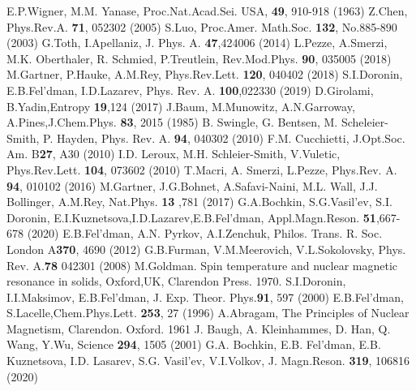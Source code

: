 \documentclass[preprint,12pt]{elsarticle}
\begin{document}
\begin{thebibliography}{20}
	 E.P.Wigner, M.M. Yanase, Proc.Nat.Acad.Sei. USA, \textbf{49}, 910-918 (1963)
	 Z.Chen, Phys.Rev.A. \textbf{71}, 052302 (2005)
   S.Luo, Proc.Amer. Math.Soc. \textbf{132}, No.885-890 (2003)
   G.Toth, I.Apellaniz, J. Phys. A. \textbf{47},424006 (2014)
   L.Pezze, A.Smerzi, M.K. Oberthaler, R. Schmied, P.Treutlein, Rev.Mod.Phys. \textbf{90}, 035005 (2018)
   M.Gartner, P.Hauke, A.M.Rey, Phys.Rev.Lett. \textbf{120}, 040402 (2018)
   S.I.Doronin, E.B.Fel'dman, I.D.Lazarev, Phys. Rev. A. \textbf{100},022330 (2019)
   D.Girolami, B.Yadin,Entropy \textbf{19},124 (2017)
   J.Baum, M.Munowitz, A.N.Garroway, A.Pines,J.Chem.Phys. \textbf{83}, 2015 (1985)
   B. Swingle, G. Bentsen, M. Scheleier-Smith, P. Hayden, Phys.	Rev. A. \textbf{94}, 040302 (2010)
   F.M. Cucchietti, J.Opt.Soc. Am. B\textbf{27}, A30 (2010)
   I.D. Leroux, M.H. Schleier-Smith, V.Vuletic, Phys.Rev.Lett. \textbf{104}, 073602 (2010)
   T.Macri, A. Smerzi, L.Pezze, Phys.Rev. A. \textbf{94}, 010102 (2016)
   M.Gartner, J.G.Bohnet, A.Safavi-Naini, M.L. Wall, J.J. Bollinger, A.M.Rey, Nat.Phys. \textbf{13} ,781 (2017)
   G.A.Bochkin, S.G.Vasil'ev, S.I. Doronin, E.I.Kuznetsova,I.D.Lazarev,E.B.Fel'dman, Appl.Magn.Reson. \textbf{51},667-678 (2020)
   E.B.Fel'dman, A.N. Pyrkov, A.I.Zenchuk, Philos. Trans. R. Soc. London A\textbf{370}, 4690 (2012)
   G.B.Furman, V.M.Meerovich, V.L.Sokolovsky, Phys. Rev. A.\textbf{78} 042301 (2008)
   M.Goldman. Spin temperature and nuclear magnetic resonance in solids, Oxford,UK, Clarendon Press. 1970.
   S.I.Doronin, I.I.Maksimov, E.B.Fel’dman, J. Exp. Theor. Phys.\textbf{91}, 597 (2000)
   E.B.Fel'dman, S.Lacelle,Chem.Phys.Lett. \textbf{253}, 27 (1996)
   A.Abragam, The Principles of Nuclear Magnetism, Clarendon. Oxford. 1961
   J. Baugh, A. Kleinhammes, D. Han, Q. Wang, Y.Wu, Science \textbf{294}, 1505 (2001)
   G.A. Bochkin, E.B. Fel'dman, E.B. Kuznetsova, I.D. Lasarev, S.G. Vasil'ev, V.I.Volkov, J. Magn.Reson. \textbf{319}, 106816 (2020)
\end{thebibliography}
\end{document}
